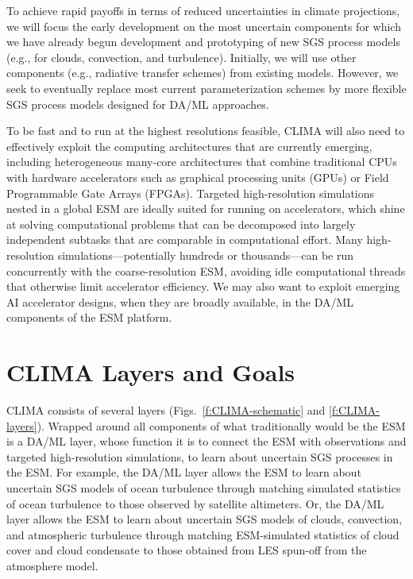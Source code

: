 \documentclass{article}
\begin{document}
To achieve rapid payoffs in terms of reduced uncertainties in climate projections, we will focus the early development on the most uncertain components for which we have already begun development and prototyping of new SGS process models (e.g., for clouds, convection, and turbulence). Initially, we will use other components (e.g., radiative transfer schemes) from existing models. However, we seek to eventually replace most current parameterization schemes by more flexible SGS process models designed for DA/ML approaches. 

To be fast and to run at the highest resolutions feasible, CLIMA will also need to effectively exploit the computing architectures that are currently emerging, including heterogeneous many-core architectures that combine traditional CPUs with hardware accelerators such as graphical processing units (GPUs) or Field Programmable Gate Arrays (FPGAs). Targeted high-resolution simulations nested in a global ESM are ideally suited for running on accelerators, which shine at solving computational problems that can be decomposed into largely independent subtasks that are comparable in computational effort. Many high-resolution simulations---potentially hundreds or thousands---can be run concurrently with the coarse-resolution ESM, avoiding idle computational threads that otherwise limit accelerator efficiency. We may also want to exploit emerging AI accelerator designs, when they are broadly available, in the DA/ML components of the ESM platform.

\section{CLIMA Layers and Goals}

CLIMA consists of several layers (Figs.~\ref{f:CLIMA-schematic} and \ref{f:CLIMA-layers}). Wrapped around all components of what traditionally would be the ESM is a DA/ML layer, whose function it is to connect the ESM with observations and targeted high-resolution simulations, to learn about uncertain SGS processes in the ESM. For example, the DA/ML layer allows the ESM to learn about uncertain SGS models of ocean turbulence through matching simulated statistics of ocean turbulence to those observed by satellite altimeters. Or, the DA/ML layer allows the ESM to learn about uncertain SGS models of clouds, convection, and atmospheric turbulence through matching ESM-simulated statistics of cloud cover and cloud condensate to those obtained from LES spun-off from the atmosphere model. 
\end{document}
